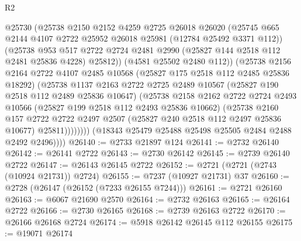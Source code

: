 \begin{lexlean}{R2}
\begin{coremodule}
                    @25730
                    (@25738
                      @2150
                      @2152
                      @4259
                      @2725
                      @26018
                      @26020
                      (@25745
                        @665
                        @2144
                        @4107
                        @2722
                        @25952
                        @26018
                        @25981
                        (@12784 @25492 @3371 @112))
                      (@25738
                        @953
                        @517
                        @2722
                        @2724
                        @2481
                        @2990
                        (@25827 @144 @2518 @112 @2481 @25836 @4228)
                        @25812))
                    (@4581 @25502 @2480 @112))
                  (@25738
                    @2156
                    @2164
                    @2722
                    @4107
                    @2485
                    @10568
                    (@25827 @175 @2518 @112 @2485 @25836 @18292)
                    (@25738
                      @1137
                      @2163
                      @2722
                      @2725
                      @2489
                      @10567
                      (@25827 @190 @2518 @112 @2489 @25836 @10647)
                      (@25738
                        @2158
                        @2162
                        @2722
                        @2724
                        @2493
                        @10566
                        (@25827 @199 @2518 @112 @2493 @25836 @10662)
                        (@25738
                          @2160
                          @157
                          @2722
                          @2722
                          @2497
                          @2507
                          (@25827 @240 @2518 @112 @2497 @25836 @10677)
                          @25811))))))))
          (@18343 @25479 @25488 @25498 @25505 @2484 @2488 @2492 @2496))))
@26140 := @2733 @21897 @124
@26141 := @2732 @26140
@26142 := @26141 @2722
@26143 := @2730 @26142
@26145 := @2739 @26140 @2722
@26147 := @26143 @26145 @2722
@26152 := @2721 (@2721 (@2743 (@10924 @21731)) @2724)
@26155 := @7237 (@10927 @21731) @37
@26160 := @2728 (@26147 (@26152 (@7233 @26155 @7244)))
@26161 := @2721 @26160
@26163 := @6067 @21690 @2570
@26164 := @2732 @26163
@26165 := @26164 @2722
@26166 := @2730 @26165
@26168 := @2739 @26163 @2722
@26170 := @26166 @26168 @2724
@26174 := @5918 @26142 @26145 @112 @26155
@26175 := @19071 @26174

\end{coremodule}
\end{lexlean}
